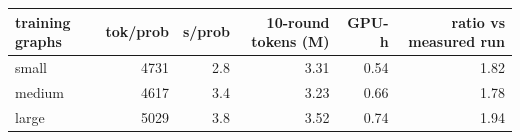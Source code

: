 \begin{tabular}{lrrrrr}
\toprule
training graphs & tok/prob & s/prob & 10-round tokens (M) & GPU-h & ratio vs measured run \\
\midrule
small & 4731 & 2.8 & 3.31 & 0.54 & 1.82 \\
medium & 4617 & 3.4 & 3.23 & 0.66 & 1.78 \\
large & 5029 & 3.8 & 3.52 & 0.74 & 1.94 \\
\bottomrule
\end{tabular}
